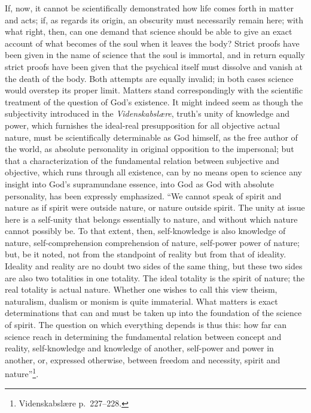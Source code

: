 \documentclass[12pt,a4paper]{article}
\newcommand{\opage}[1]{\marginnote{\footnotesize\textit{[#1]}}}
\begin{document}
If, now, it cannot be scientifically demonstrated how life comes forth
in matter and acts; if, as regards its origin, an obscurity must
necessarily remain here; with what right, then, can one demand that
science should be able to give an exact account of what becomes of the
soul when it leaves the body? Strict proofs have been given in the
name of science that the soul is immortal, and in return equally
strict proofs have been given that the psychical itself must dissolve
and vanish at the death of the body. Both attempts are equally
invalid; in both cases science would overstep its proper limit.
Matters stand correspondingly with the scientific treatment of the
question of God's existence. It might indeed seem as though the
subjectivity introduced in the \textit{Videnskabslære}, truth's unity
of knowledge and power, which furnishes the ideal-real presupposition
for all objective actual nature, must be scientifically determinable
as God himself, as the free author of the world, as absolute
personality in original opposition to the impersonal; but that a
characterization of the fundamental relation between subjective and
objective, which runs through all existence, can by no means open to
science any insight into God's supramundane essence, into God as God
with absolute personality, has been expressly emphasized. ``We cannot
speak of spirit and nature as if spirit were outside nature, or nature
outside spirit. The unity at issue here is a self-unity that belongs
essentially to nature, and without which nature cannot possibly be. To
that extent, then, self-knowledge is also knowledge of nature,
self-comprehension comprehension of nature, self-power power of
nature; but, be it noted, not from the standpoint of reality but from
that of ideality. Ideality and reality are no doubt two sides of the
same thing, but these two sides are also two totalities in one
totality. The ideal totality is the spirit of nature; the real
totality is actual nature. Whether one wishes to call this view
theism, naturalism, dualism or monism is quite immaterial. What
matters is exact determinations that can and must be taken up into
the foundation of the
\opage{43}science of spirit. The question on which everything depends
is thus this: how far can science reach in determining the fundamental
relation between concept and reality, self-knowledge and knowledge of
another, self-power and power in another, or, expressed otherwise,
between freedom and necessity, spirit and nature''\footnote{Videnskabslære p.\ 227--228.}. %
\end{document}
